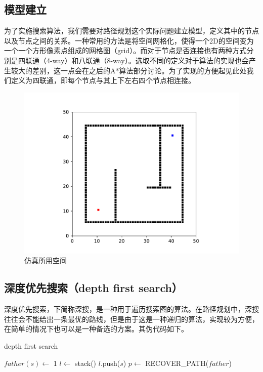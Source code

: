 \documentclass[12pt]{article}
\begin{document}
    \subsection{模型建立}
    为了实施搜索算法，我们需要对路径规划这个实际问题建立模型，定义其中的节点以及节点之间的关系。一种常用的方法是将空间网格化，使得一个2D的空间变为一个一个方形像素点组成的网格图（grid）。而对于节点是否连接也有两种方式分别是四联通（4-way）和八联通（8-way）。选取不同的定义对于算法的实现也会产生较大的差别，这一点会在之后的A*算法部分讨论。为了实现的方便起见此处我们定义为四联通，即每个节点与其上下左右四个节点相连接。
    \begin{figure}[H]
        \centering
        \includegraphics[scale=0.6]{fig/map.pdf}
        \caption{仿真所用空间}
    \end{figure}

    \subsection{深度优先搜索（depth first search）}
    深度优先搜索，下简称深搜，是一种用于遍历搜索图的算法。在路径规划中，深搜往往会不能给出一条最优的路线，但是由于这是一种递归的算法，实现较为方便，在简单的情况下也可以是一种备选的方案。其伪代码如下。

    \begin{algorithm}[H]
        \caption{depth first search}
        $father(s)\gets$ 1 \;
        $l \gets$ stack()\;
        $l$.push($s$)\;
        $p \gets $ RECOVER\_PATH($father$)\;
    \end{algorithm}
\end{document}

